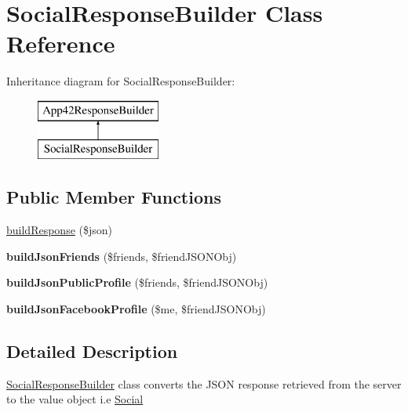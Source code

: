 \hypertarget{class_social_response_builder}{\section{Social\+Response\+Builder Class Reference}
\label{class_social_response_builder}
}
Inheritance diagram for Social\+Response\+Builder\+:\begin{figure}[H]
\begin{center}
\leavevmode
\includegraphics[height=2.000000cm]{class_social_response_builder}
\end{center}
\end{figure}
\subsection*{Public Member Functions}
\begin{DoxyCompactItemize}
\item 
\hyperlink{class_social_response_builder_a8bc94acdaada04a52b74b8f9afb25c4c}{build\+Response} (\$json)
\item 
\hypertarget{class_social_response_builder_aa4f6690c99da5b45037bd48e67f0f9bd}{{\bfseries build\+Json\+Friends} (\$friends, \$friend\+J\+S\+O\+N\+Obj)}\label{class_social_response_builder_aa4f6690c99da5b45037bd48e67f0f9bd}

\item 
\hypertarget{class_social_response_builder_a0b88a873aed2f41b9385ca121dcac4ac}{{\bfseries build\+Json\+Public\+Profile} (\$friends, \$friend\+J\+S\+O\+N\+Obj)}\label{class_social_response_builder_a0b88a873aed2f41b9385ca121dcac4ac}

\item 
\hypertarget{class_social_response_builder_a407ce44f9d28d031a70ec14144326e5a}{{\bfseries build\+Json\+Facebook\+Profile} (\$me, \$friend\+J\+S\+O\+N\+Obj)}\label{class_social_response_builder_a407ce44f9d28d031a70ec14144326e5a}

\end{DoxyCompactItemize}


\subsection{Detailed Description}
\hyperlink{class_social_response_builder}{Social\+Response\+Builder} class converts the J\+S\+O\+N response retrieved from the server to the value object i.\+e \hyperlink{class_social}{Social} 

